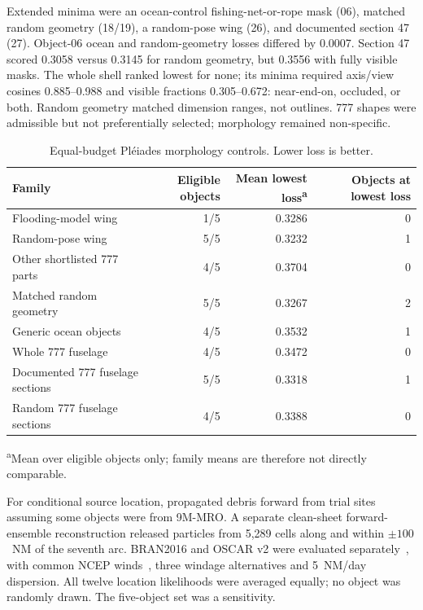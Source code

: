 Extended minima were an ocean-control fishing-net-or-rope mask (06), matched
random geometry (18/19), a random-pose wing (26), and documented section 47
(27). Object-06 ocean and random-geometry losses differed by 0.0007. Section 47
scored 0.3058 versus 0.3145 for random geometry, but 0.3556 with fully visible
masks. The whole shell ranked lowest for none; its minima required axis/view
cosines 0.885--0.988 and visible fractions 0.305--0.672: near-end-on, occluded,
or both. Random geometry matched dimension ranges, not outlines. 777 shapes
were admissible but not preferentially selected; morphology remained
non-specific.

\begin{table}[t]
  \centering
  \footnotesize
  \caption{Equal-budget Pl\'eiades morphology controls. Lower loss is better.}
  \label{tab:pleiades-morphology-controls}
  \begin{tabular}{lrrr}
    \toprule
    Family & Eligible objects & Mean lowest loss\textsuperscript{a} &
      Objects at lowest loss \\
    \midrule
    Flooding-model wing            & 1/5 & 0.3286 & 0 \\
    Random-pose wing               & 5/5 & 0.3232 & 1 \\
    Other shortlisted 777 parts    & 4/5 & 0.3704 & 0 \\
    Matched random geometry        & 5/5 & 0.3267 & 2 \\
    Generic ocean objects          & 4/5 & 0.3532 & 1 \\
    Whole 777 fuselage               & 4/5 & 0.3472 & 0 \\
    Documented 777 fuselage sections & 5/5 & 0.3318 & 1 \\
    Random 777 fuselage sections     & 4/5 & 0.3388 & 0 \\
    \bottomrule
  \end{tabular}

  \vspace{2pt}
  \parbox{0.94\linewidth}{\footnotesize\textsuperscript{a}Mean over eligible
  objects only; family means are therefore not directly comparable.}
\end{table}

For conditional source location, \citet{griffin2017drift} propagated debris
forward from trial sites assuming some objects were from 9M-MRO. A separate
clean-sheet forward-ensemble reconstruction released particles from 5,289
cells along and within $\pm100$~NM of the seventh arc. BRAN2016 and OSCAR v2
were evaluated separately~\citep{dohan2021oscar}, with common NCEP
winds~\citep{kalnay1996reanalysis}, three windage alternatives and 5~NM/day
dispersion. All twelve location likelihoods were averaged equally; no object
was randomly drawn. The five-object set was a sensitivity.

